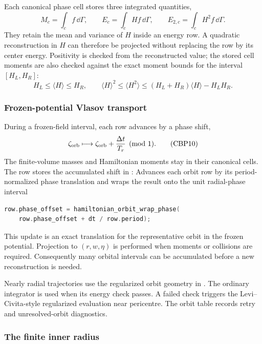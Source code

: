 Each canonical phase cell stores three integrated quantities,
\[
  M_c=\int_c f\,\dd\Gamma,\qquad
  E_c=\int_c Hf\,\dd\Gamma,\qquad
  E_{2,c}=\int_c H^2f\,\dd\Gamma.                        \tag{CBP8}
\]
They retain the mean and variance of \(H\) inside an energy row.  A quadratic
reconstruction in \(H\) can therefore be projected without replacing the row
by its center energy.  Positivity is checked from the reconstructed value;
the stored cell moments are also checked against the exact moment bounds for
the interval \([H_L,H_R]\):
\[
 H_L\le \langle H\rangle\le H_R,\qquad
 \langle H\rangle^2\le\langle H^2\rangle
 \le(H_L+H_R)\langle H\rangle-H_LH_R.                  \tag{CBP9}
\]

\subsubsection{Frozen-potential Vlasov transport}

During a frozen-field interval, each row advances by a phase shift,
\[
  \zeta_{\rm orb}\longmapsto
  \zeta_{\rm orb}+\frac{\Delta t}{T_r}\pmod 1.         \tag{CBP10}
\]
The finite-volume masses and Hamiltonian moments stay in their canonical
cells.  The row stores the accumulated shift in :
{}
{Advances each orbit row by its period-normalized phase translation and wraps
 the result onto the unit radial-phase interval}
\begin{lstlisting}[language=C++]
row.phase_offset = hamiltonian_orbit_wrap_phase(
    row.phase_offset + dt / row.period);
\end{lstlisting}

This update is an exact translation for the representative orbit in the
frozen potential.  Projection to \((r,w,\eta)\) is performed when moments or
collisions are required.  Consequently many orbital intervals can be
accumulated before a new reconstruction is needed.

Nearly radial trajectories use the regularized orbit geometry in
.  The ordinary integrator is
used when its energy check passes.  A failed check triggers the
Levi--Civita-style regularized evaluation near pericentre.  The orbit table
records retry and unresolved-orbit diagnostics.

\subsubsection{The finite inner radius}
\label{sec:delayed-inner-carrier}

